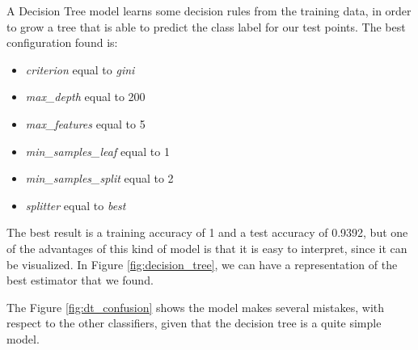 A Decision Tree model learns some decision rules from the training data, in order to grow a tree that is able to predict the class label for our test points. 
The best configuration found is:
\begin{itemize}
\item \emph{criterion} equal to \emph{gini}
\item \emph{max\_depth} equal to 200
\item \emph{max\_features} equal to 5
\item \emph{min\_samples\_leaf} equal to 1
\item \emph{min\_samples\_split} equal to 2
\item \emph{splitter} equal to \emph{best}
\end{itemize}

The best result is a training accuracy of 1 and a test accuracy of 0.9392, but one of the advantages of this kind of model is that it is easy to interpret, since it can be visualized.
In Figure \ref{fig:decision_tree}, we can have a representation of the best estimator that we found.

The Figure \ref{fig:dt_confusion} shows the model makes several mistakes, with respect to the other classifiers, given that the decision tree is a quite simple model.

